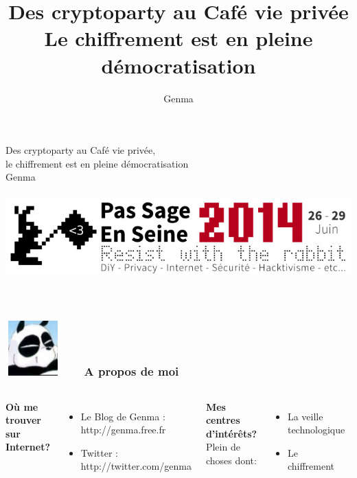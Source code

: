 \documentclass{beamer}
\title[Les Chiffrofêtes]{Des cryptoparty au Café vie privée \\Le chiffrement est en pleine démocratisation}
\author{Genma}
\begin{document}
\begin{frame}
	\begin{center}
	 	\huge{Des cryptoparty au Café vie privée, \\le chiffrement est en pleine démocratisation}
	 	\\
		\Large{Genma}
	 	\\~\\
		\includegraphics[scale=0.5] {logoPSES.jpg} 
		\\~\\
		\\
		{\tiny\CcNote{\CcLongnameByNcSa}}
		\vspace*{-2.5ex}
	\end{center}
\end{frame}




\begin{frame}
\frametitle{\includegraphics[scale=0.4]{./Genma.jpg} \ \ \  A propos de moi  }
\begin{columns}[c] 

\textbf{Où me trouver sur Internet?}
\begin{itemize}
\item Le Blog de Genma : http://genma.free.fr
\item Twitter : http://twitter.com/genma
\end{itemize}

\textbf{Mes centres d'intérêts?}
\\ Plein de choses dont:
\begin{itemize}
\item La veille technologique
\item Le chiffrement
\end{itemize}

\includegraphics[width=5cm,height=5cm]{./blog.jpg} 

\end{columns}
\end{frame}
\end{document}
